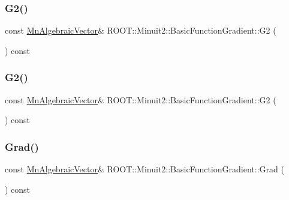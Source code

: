 \subsubsection{\texorpdfstring{G2()}{G2()}\hspace{0.1cm}{\footnotesize\ttfamily [1/2]}}
{\footnotesize\ttfamily const \mbox{\hyperlink{namespaceROOT_1_1Minuit2_a62ed97730a1ca8d3fbaec64a19aa11c9}{Mn\+Algebraic\+Vector}}\& R\+O\+O\+T\+::\+Minuit2\+::\+Basic\+Function\+Gradient\+::\+G2 (\begin{DoxyParamCaption}{ }\end{DoxyParamCaption}) const\hspace{0.3cm}{\ttfamily [inline]}}

\mbox{\label{classROOT_1_1Minuit2_1_1BasicFunctionGradient_a7d06765b80da1a8baa4af474b503ec6c}} 
\subsubsection{\texorpdfstring{G2()}{G2()}\hspace{0.1cm}{\footnotesize\ttfamily [2/2]}}
{\footnotesize\ttfamily const \mbox{\hyperlink{namespaceROOT_1_1Minuit2_a62ed97730a1ca8d3fbaec64a19aa11c9}{Mn\+Algebraic\+Vector}}\& R\+O\+O\+T\+::\+Minuit2\+::\+Basic\+Function\+Gradient\+::\+G2 (\begin{DoxyParamCaption}{ }\end{DoxyParamCaption}) const\hspace{0.3cm}{\ttfamily [inline]}}

\mbox{\label{classROOT_1_1Minuit2_1_1BasicFunctionGradient_a724c9b5e8c9cf8646eb362017158f52d}} 
\subsubsection{\texorpdfstring{Grad()}{Grad()}\hspace{0.1cm}{\footnotesize\ttfamily [1/2]}}
{\footnotesize\ttfamily const \mbox{\hyperlink{namespaceROOT_1_1Minuit2_a62ed97730a1ca8d3fbaec64a19aa11c9}{Mn\+Algebraic\+Vector}}\& R\+O\+O\+T\+::\+Minuit2\+::\+Basic\+Function\+Gradient\+::\+Grad (\begin{DoxyParamCaption}{ }\end{DoxyParamCaption}) const\hspace{0.3cm}{\ttfamily [inline]}}


